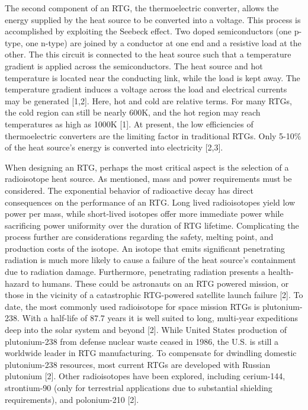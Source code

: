 \documentclass{article}
\newcommand{\tab}{\-\hspace{1cm}}
\begin{document}
\begin{multicols}{2}
\tab The second component of an RTG, the thermoelectric converter, allows the energy supplied by the heat source to be converted into a voltage. This process is accomplished by exploiting the Seebeck effect. Two doped semiconductors (one p-type, one n-type) are joined by a conductor at one end and a resistive load at the other. The this circuit is connected to the heat source such that a temperature gradient is applied across the semiconductors. The heat source and hot temperature is located near the conducting link, while the load is kept away. The temperature gradient induces a voltage across the load and electrical currents may be generated [1,2]. Here, hot and cold are relative terms. For many RTGs, the cold region can still be nearly 600K, and the hot region may reach temperatures as high as 1000K [1]. At present, the low efficiencies of thermoelectric converters are the limiting factor in traditional RTGs. Only 5-10\% of the heat source's energy is converted into electricity [2,3].

\tab When designing an RTG, perhaps the most critical aspect is the selection of a radioisotope heat source. As mentioned, mass and power requirements must be considered. The exponential behavior of radioactive decay has direct consequences on the performance of an RTG. Long lived radioisotopes yield low power per mass, while short-lived isotopes offer more immediate power while sacrificing power uniformity over the duration of RTG lifetime. Complicating the process further are considerations regarding the safety, melting point, and production costs of the isotope. An isotope that emits significant penetrating radiation is much more likely to cause a failure of the heat source's containment due to radiation damage. Furthermore, penetrating radiation presents a health-hazard to humans. These could be astronauts on an RTG powered mission, or those in the vicinity of a catastrophic RTG-powered satellite launch failure [2]. To date, the most commonly used radioisotope for space mission RTGs is plutonium-238. With a half-life of 87.7 years it is well suited to long, multi-year expeditions deep into the solar system and beyond [2]. While United States production of plutonium-238 from defense nuclear waste ceased in 1986, the U.S. is still a worldwide leader in RTG manufacturing. To compensate for dwindling domestic plutonium-238 resources, most current RTGs are developed with Russian plutonium [2]. Other radioisotopes have been explored, including cerium-144, strontium-90 (only for terrestrial applications due to substantial shielding requirements), and polonium-210 [2].


\end{multicols}
\end{document}
